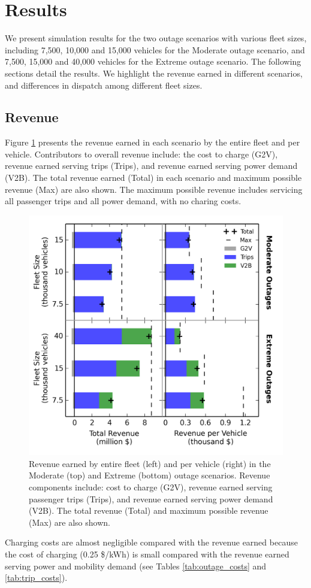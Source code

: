 \documentclass[conference]{IEEEtran}
\begin{document}
\section{Results}
We present simulation results for the two outage scenarios with various fleet sizes, including 7,500, 10,000 and 15,000 vehicles for the Moderate outage scenario, and 7,500, 15,000 and 40,000 vehicles for the Extreme outage scenario. The following sections detail the results. We highlight the revenue earned in different scenarios, and differences in dispatch among different fleet sizes.

\subsection{Revenue}
Figure \ref{fig:revenue_bar} presents the revenue earned in each scenario by the entire fleet and per vehicle. Contributors to overall revenue include: the cost to charge (G2V), revenue earned serving trips (Trips), and revenue earned serving power demand (V2B). The total revenue earned (Total) in each scenario and maximum possible revenue (Max) are also shown. The maximum possible revenue includes servicing all passenger trips and all power demand, with no charing costs.
\begin{figure}[!htbp]
  \begin{center}
  \includegraphics[width=0.8\linewidth]{plots/full_revenue_barchart.png}
  \end{center}
  \vspace{-5pt}
  \caption{Revenue earned by entire fleet (left) and per vehicle (right) in the Moderate (top) and Extreme (bottom) outage scenarios. Revenue components include: cost to charge (G2V), revenue earned serving passenger trips (Trips), and revenue earned serving power demand (V2B). The total revenue (Total) and maximum possible revenue (Max) are also shown.}
  \label{fig:revenue_bar}
\end{figure}
Charging costs are almost negligible compared with the revenue earned because the cost of charging (0.25 \$/kWh) is small compared with the revenue earned serving power and mobility demand (see Tables \ref{tab:outage_costs} and \ref{tab:trip_costs}).
\end{document}
